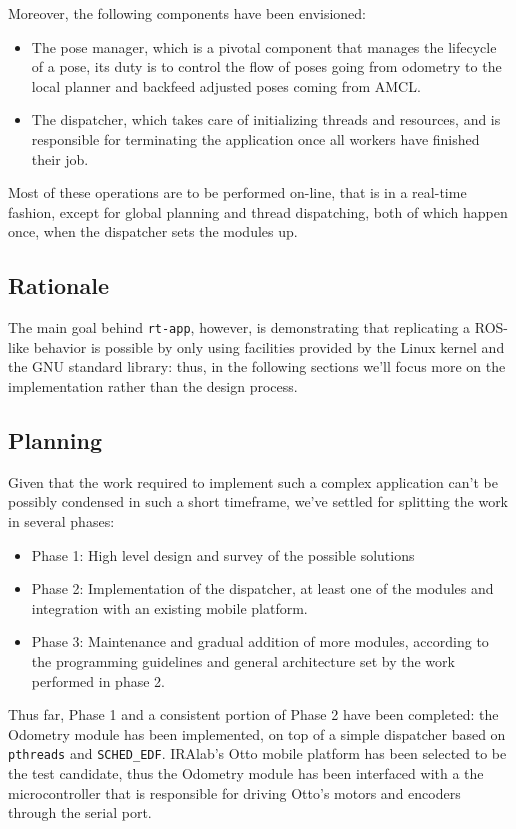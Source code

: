 \documentclass[a4paper,12pt]{report}
\begin{document}
Moreover, the following components have been envisioned:
\begin{itemize}
  \item The pose manager, which is a pivotal component that manages the lifecycle of a pose, its duty is to control the flow of poses going from odometry to the local planner and backfeed adjusted poses coming from AMCL.
  \item The dispatcher, which takes care of initializing threads and resources, and is responsible for terminating the application once all workers have finished their job.
\end{itemize}

Most of these operations are to be performed on-line, that is in a real-time fashion, except for global planning and thread dispatching, both of which happen once, when the dispatcher sets the modules up.

\subsection{Rationale}

The main goal behind \texttt{rt-app}, however, is demonstrating that replicating a ROS-like behavior is possible by only using facilities provided by the Linux kernel and the GNU standard library: thus, in the following sections we'll focus more on the implementation rather than the design process.

\subsection{Planning}

Given that the work required to implement such a complex application can't be possibly condensed in such a short timeframe, we've settled for splitting the work in several phases:
\begin{itemize}
  \item Phase 1: High level design and survey of the possible solutions
  \item Phase 2: Implementation of the dispatcher, at least one of the modules and integration with an existing mobile platform.
  \item Phase 3: Maintenance and gradual addition of more modules, according to the programming guidelines and general architecture set by the work performed in phase 2.
\end{itemize}

Thus far, Phase 1 and a consistent portion of Phase 2 have been completed: the Odometry module has been implemented, on top of a simple dispatcher based on \texttt{pthreads} and \texttt{SCHED\_EDF}. IRAlab's Otto mobile platform has been selected to be the test candidate, thus the Odometry module has been interfaced with a the microcontroller that is responsible for driving Otto's motors and encoders through the serial port.
\end{document}
